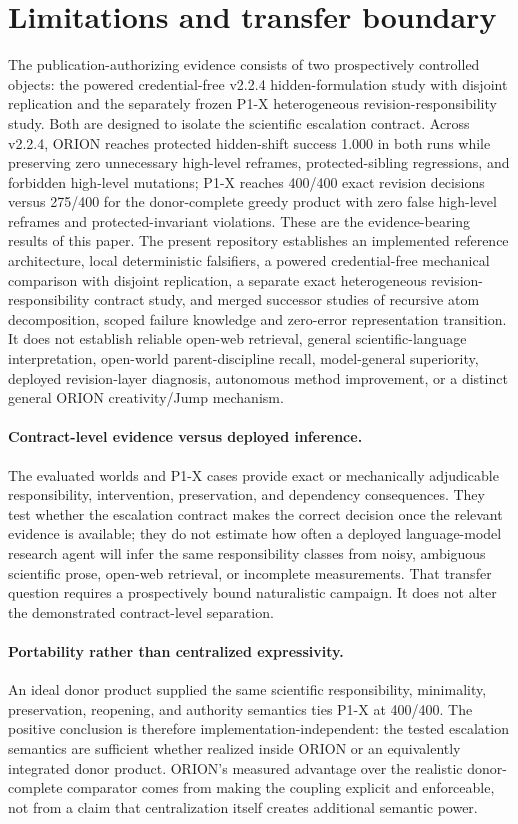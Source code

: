 \section{Limitations and transfer boundary}

The publication-authorizing evidence consists of two prospectively controlled objects: the powered credential-free v2.2.4 hidden-formulation study with disjoint replication and the separately frozen P1-X heterogeneous revision-responsibility study. Both are designed to isolate the scientific escalation contract. Across v2.2.4, ORION reaches protected hidden-shift success 1.000 in both runs while preserving zero unnecessary high-level reframes, protected-sibling regressions, and forbidden high-level mutations; P1-X reaches 400/400 exact revision decisions versus 275/400 for the donor-complete greedy product with zero false high-level reframes and protected-invariant violations. These are the evidence-bearing results of this paper.
The present repository establishes an implemented reference architecture, local deterministic falsifiers, a powered credential-free mechanical comparison with disjoint replication, a separate exact heterogeneous revision-responsibility contract study, and merged successor studies of recursive atom decomposition, scoped failure knowledge and zero-error representation transition. It does not establish reliable open-web retrieval, general scientific-language interpretation, open-world parent-discipline recall, model-general superiority, deployed revision-layer diagnosis, autonomous method improvement, or a distinct general ORION creativity/Jump mechanism.

\paragraph{Contract-level evidence versus deployed inference.}
The evaluated worlds and P1-X cases provide exact or mechanically adjudicable responsibility, intervention, preservation, and dependency consequences. They test whether the escalation contract makes the correct decision once the relevant evidence is available; they do not estimate how often a deployed language-model research agent will infer the same responsibility classes from noisy, ambiguous scientific prose, open-web retrieval, or incomplete measurements. That transfer question requires a prospectively bound naturalistic campaign. It does not alter the demonstrated contract-level separation.

\paragraph{Portability rather than centralized expressivity.}
An ideal donor product supplied the same scientific responsibility, minimality, preservation, reopening, and authority semantics ties P1-X at 400/400. The positive conclusion is therefore implementation-independent: the tested escalation semantics are sufficient whether realized inside ORION or an equivalently integrated donor product. ORION's measured advantage over the realistic donor-complete comparator comes from making the coupling explicit and enforceable, not from a claim that centralization itself creates additional semantic power.

